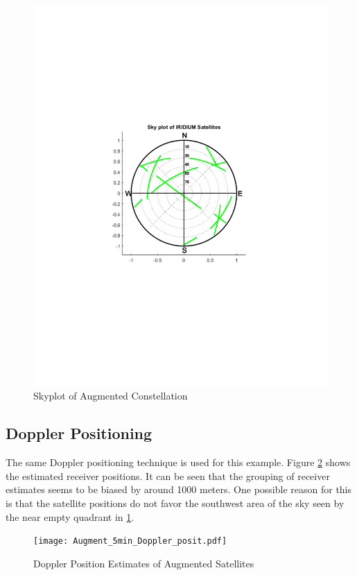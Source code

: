 \documentclass[12pt]{report}
\begin{document}
\begin{figure}[h!]
    \centering
    \includegraphics[trim=1.2in 3.3in 1.75in 3.7in,clip,width=5in]
    {Augment_Skyplot.pdf}
    \caption{Skyplot of Augmented Constellation}
    \label{fig:AugmentSky}
\end{figure}
\pagebreak

\subsection{Doppler Positioning}
The same Doppler positioning technique is used for this example. Figure \ref{fig:Augmentdopplerposit} shows the estimated receiver positions. It can be seen that the grouping of receiver estimates seems to be biased by around 1000 meters. One possible reason for this is that the satellite positions do not favor the southwest area of the sky seen by the near empty quadrant in \ref{fig:AugmentSky}. 

\begin{figure}[h!]
    \centering
    \texttt{[image: Augment\_5min\_Doppler\_posit.pdf]}
    \caption{Doppler Position Estimates of Augmented Satellites}
    \label{fig:Augmentdopplerposit}
\end{figure}
\end{document}
